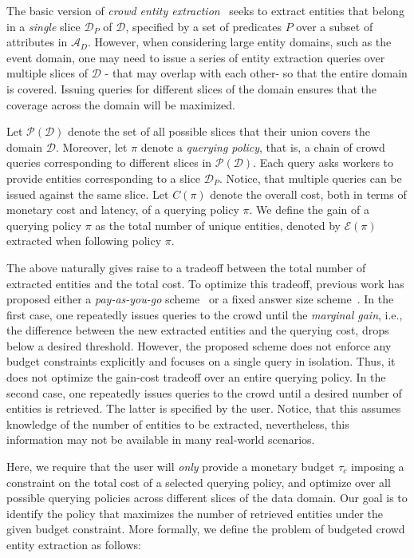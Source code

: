 \documentclass{vldb}
\newcommand{\domain}{\mathcal{D}}
\newcommand{\attributes}{\mathcal{A}_D}
\newcommand{\uentities}{\mathcal{E}}
\begin{document}
The basic version of {\em crowd entity extraction}~\cite{trushkowsky:2013} seeks to extract entities that belong in a {\em single} slice $\domain_P$ of $\domain$, specified by a set of predicates $P$ over a subset of attributes in $\attributes$. However, when considering large entity domains, such as the event domain, one may need to issue a series of entity extraction queries over multiple slices of $\domain$ - that may overlap with each other- so that the entire domain is covered. Issuing queries for different slices of the domain ensures that the coverage across the domain will be maximized. 

Let $\mathcal{P}(\domain)$ denote the set of all possible slices that their union covers the domain $\domain$. Moreover, let $\pi$ denote a {\em querying policy}, that is, a chain of crowd queries corresponding to different slices in $\mathcal{P}(\domain)$. Each query asks workers to provide entities corresponding to a slice $\domain_P$. Notice, that multiple queries can be issued against the same slice. Let $C(\pi)$ denote the overall cost, both in terms of monetary cost and latency, of a querying policy $\pi$. We define the gain of a querying policy $\pi$ as the total number of unique entities, denoted by $\uentities(\pi)$ extracted when following policy $\pi$. 

The above naturally gives raise to a tradeoff between the total number of extracted entities and the total cost. To optimize this tradeoff, previous work has proposed either a {\em pay-as-you-go} scheme~\cite{trushkowsky:2013} or a fixed answer size scheme~\cite{park:2014}. In the first case, one repeatedly issues queries to the crowd until the {\em marginal gain}, i.e., the difference between the new extracted entities and the querying cost, drops below a desired threshold. However, the proposed scheme does not enforce any budget constraints explicitly and focuses on a single query in isolation. Thus, it does not optimize the gain-cost tradeoff over an entire querying policy. In the second case, one repeatedly issues queries to the crowd until a desired number of entities is retrieved. The latter is specified by the user. Notice, that this assumes knowledge of the number of entities to be extracted, nevertheless, this information may not be available in many real-world scenarios. 

Here, we require that the user will {\em only} provide a monetary budget $\tau_c$ imposing a constraint on the total cost of a selected querying policy, and optimize over all possible querying policies across different slices of the data domain. Our goal is to identify the policy that maximizes the number of retrieved entities under the given budget constraint. More formally, we define the problem of budgeted crowd entity extraction as follows:
\end{document}
